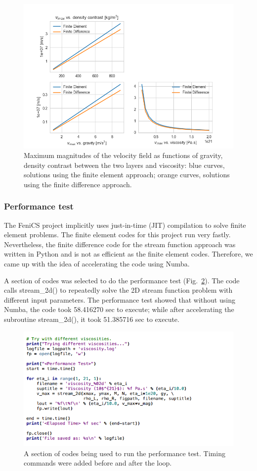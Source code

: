 \documentclass[11pt]{article}
\numberwithin{figure}{section}  %
\numberwithin{equation}{section}  %
\begin{document}
\begin{multicols}{2}
\begin{figure}[!htb]
	\centering
	\includegraphics[width=0.7\linewidth]{../Python/output/fd_solution/log/fe_vs_fd}
	\caption{Maximum magnitudes of the velocity field as functions of gravity, density contrast between the two layers and viscosity: blue curves, solutions using the finite element approach; orange curves, solutions using the finite difference approach.}
	\label{fig:fevsfd}
\end{figure}

\subsubsection{Performance test}

The FeniCS project implicitly uses just-in-time (JIT) compilation to solve finite element problems. The finite element codes for this project run very fastly. Nevertheless, the finite difference code for the stream function approach was written in Python and is not as efficient as the finite element codes. Therefore, we came up with the idea of accelerating the code using Numba.

A section of codes was selected to do the performance test (Fig.\ \ref{fig:performtest}). The code calls \textsf{stream\_2d()} to repeatedly solve the 2D stream function problem with different input parameters. The performance test showed that without using Numba, the code took 58.416270 sec to execute; while after accelerating the subroutine \textsf{stream\_2d()}, it took 51.385716 sec to execute.

\begin{figure}[!htb]
	\centering
	\includegraphics[width=0.7\linewidth]{../Python/report/fd_numba/perform_test}
	\caption{A section of codes being used to run the performance test. Timing commands were added before and after the loop.}
	\label{fig:performtest}
\end{figure}


\end{multicols}
\end{document}
